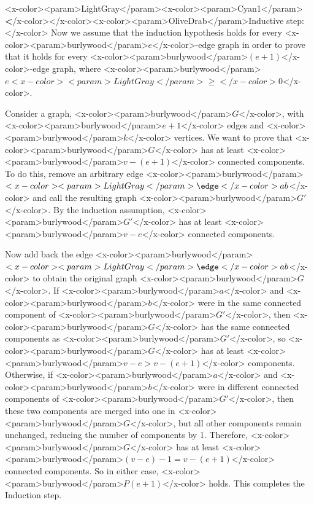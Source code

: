 {<x-color><param>LightGray</param><x-color><param>Cyan1</param>\textbf</x-color></x-color><x-color><param>OliveDrab</param>{Inductive step:}</x-color> Now we assume that the induction hypothesis holds
for every <x-color><param>burlywood</param>$e$</x-color>-edge graph in order to prove that it holds for every
<x-color><param>burlywood</param>$(e+1)$</x-color>-edge graph, where <x-color><param>burlywood</param>$e <x-color><param>LightGray</param>\geq</x-color> 0$</x-color>.

Consider a graph, <x-color><param>burlywood</param>$G$</x-color>, with <x-color><param>burlywood</param>$e + 1$</x-color> edges and <x-color><param>burlywood</param>$k$</x-color> vertices.  We want to
prove that <x-color><param>burlywood</param>$G$</x-color> has at least <x-color><param>burlywood</param>$v - (e+1)$</x-color> connected components.
To do this, remove an arbitrary edge <x-color><param>burlywood</param>$<x-color><param>LightGray</param>\edge</x-color>{a}{b}$</x-color> and call the resulting
graph <x-color><param>burlywood</param>$G'$</x-color>.  By the induction assumption, <x-color><param>burlywood</param>$G'$</x-color> has at least <x-color><param>burlywood</param>$v - e$</x-color>
connected components.

Now add back the edge <x-color><param>burlywood</param>$<x-color><param>LightGray</param>\edge</x-color>{a}{b}$</x-color> to obtain the original graph <x-color><param>burlywood</param>$G$</x-color>.  If
<x-color><param>burlywood</param>$a$</x-color> and <x-color><param>burlywood</param>$b$</x-color> were in the same connected component of <x-color><param>burlywood</param>$G'$</x-color>, then <x-color><param>burlywood</param>$G$</x-color> has the
same connected components as <x-color><param>burlywood</param>$G'$</x-color>, so <x-color><param>burlywood</param>$G$</x-color> has at least <x-color><param>burlywood</param>$v -e > v - (e+1)$</x-color>
components.  Otherwise, if <x-color><param>burlywood</param>$a$</x-color> and <x-color><param>burlywood</param>$b$</x-color> were in different connected
components of <x-color><param>burlywood</param>$G'$</x-color>, then these two components are merged into one in <x-color><param>burlywood</param>$G$</x-color>,
but all other components remain unchanged, reducing the number of
components by 1.  Therefore, <x-color><param>burlywood</param>$G$</x-color> has at least <x-color><param>burlywood</param>$(v - e) - 1 = v - (e+1)$</x-color>
connected components.  So in either case, <x-color><param>burlywood</param>$P(e+1)$</x-color> holds.  This completes
the Induction step.

}
